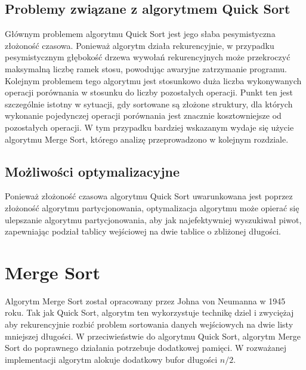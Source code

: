 \begin{figure}[H]
	\centering
	
	\caption[]{}
	\label{fig:quick-sort-density}
\end{figure}

\subsection{Problemy związane z algorytmem Quick Sort}
Głównym problemem algorytmu Quick Sort jest jego słaba pesymistyczna złożoność czasowa. Ponieważ algorytm działa rekurencyjnie, w przypadku pesymistycznym głębokość drzewa wywołań rekurencyjnych może przekroczyć maksymalną liczbę ramek stosu, powodując awaryjne zatrzymanie programu.\\

Kolejnym problemem tego algorytmu jest stosunkowo duża liczba wykonywanych operacji porównania w stosunku do liczby pozostałych operacji. Punkt ten jest szczególnie istotny w sytuacji, gdy sortowane są złożone struktury, dla których
wykonanie pojedynczej operacji porównania jest znacznie kosztowniejsze od pozostałych operacji. W tym przypadku bardziej wskazanym wydaje się użycie algorytmu Merge Sort, którego analizę przeprowadzono w kolejnym rozdziale.

\subsection{Możliwości optymalizacyjne}
Ponieważ złożoność czasowa algorytmu Quick Sort uwarunkowana jest poprzez złożoność algorytmu partycjonowania, optymalizacja algorytmu może opierać się ulepszanie algorytmu partycjonowania, aby jak najefektywniej wyszukiwał piwot, zapewniając podział tablicy wejściowej na dwie tablice o zbliżonej długości.
 

\section{Merge Sort}


Algorytm Merge Sort został opracowany przez Johna von Neumanna w 1945 roku. Tak jak Quick Sort, algorytm ten wykorzystuje
technikę dziel i zwyciężaj aby rekurencyjnie rozbić problem sortowania danych wejściowych na dwie listy mniejszej długości.
W przeciwieństwie do algorytmu Quick Sort, algorytm Merge Sort do poprawnego działania potrzebuje dodatkowej pamięci.
W rozważanej implementacji algorytm alokuje dodatkowy bufor długości $n/2$.\\

